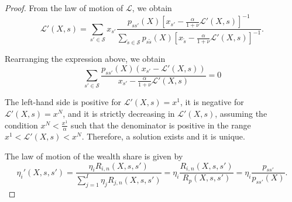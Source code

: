 \begin{proof}
From the law of motion of $\mathcal{L}$, we obtain
\begin{equation}
    \mathcal{L}'(X,s) = \sum_{s'\in \mathcal{S}} x_{s'} \frac{p_{ss'}(X) \left[x_{s'} -\frac{ \alpha}{1+\nu} \mathcal{L}'(X,s) \right]^{-1}}{\sum_{\tilde{s}\in \mathcal{S}} p_{s\tilde{s}}(X)\left[x_{\tilde{s}} -\frac{ \alpha}{1+\nu} \mathcal{L}'(X,s) \right]^{-1}}.
\end{equation}

Rearranging the expression above, we obtain
\begin{equation}
       \sum_{s'\in \mathcal{S}} \frac{p_{ss'}(X)  (x_{s'} - \mathcal{L}'(X,s))}{x_{s'} -\frac{ \alpha}{1+\nu} \mathcal{L}'(X,s) } = 0
\end{equation}

The left-hand side is positive for $\mathcal{L}'(X,s) = x^1$, it is negative for $\mathcal{L}'(X,s) = x^N$, and it is strictly decreasing in $\mathcal{L}'(X,s)$, assuming the condition $x^N < \frac{x^1}{\alpha}$ such that the denominator is positive in the range $x^1 < \mathcal{L}'(X,s) < x^N$. Therefore, a solution exists and it is unique. 

The law of motion of the wealth share is given by
\begin{equation}
    \eta_i'(X,s,s') = \frac{\eta_i R_{i,n}(X,s,s')}{\sum_{j=1}^I\eta_j R_{j,n}(X,s,s')} = \eta_i \frac{R_{i,n}(X,s,s')}{R_{p}(X,s,s')} = \eta_i \frac{p_{ss'}}{p_{ss'}(X)}.
\end{equation}

\end{proof}

